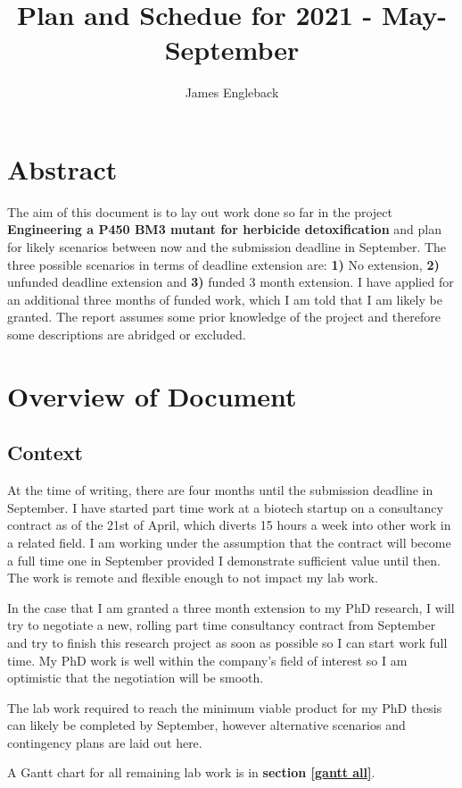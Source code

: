 \documentclass{article}
\begin{document}
\title{\textbf{Plan and Schedue for 2021 - May-September}}
\author{James Engleback}
\maketitle
\tableofcontents

\section{Abstract}
The aim of this document is to lay out work done so far in the project \textbf{Engineering a P450 BM3 mutant for herbicide detoxification} and plan for likely scenarios between now and the submission deadline in September.
The three possible scenarios in terms of deadline extension are: \textbf{1)} No extension, \textbf{2)} unfunded deadline extension and \textbf{3)} funded 3 month extension. 
I have applied for an additional three months of funded work, which I am told that I am likely be granted.
The report assumes some prior knowledge of the project and therefore some descriptions are abridged or excluded.
\par

\section{Overview of Document}
\subsection{Context}
At the time of writing, there are four months until the submission deadline in September. I have started part time work at a biotech startup on a consultancy contract as of the 21st of April, which diverts 15 hours a week into other work in a related field. I am working under the assumption that the contract will become a full time one in September provided I demonstrate sufficient value until then. The work is remote and flexible enough to not impact my lab work.
\par 
In the case that I am granted a three month extension to my PhD research, I will try to negotiate a new, rolling part time consultancy contract from September and try to finish this research project as soon as possible so I can start work full time. My PhD work is well within the company's field of interest so I am optimistic that the negotiation will be smooth.
\par
The lab work required to reach the minimum viable product for my PhD thesis can likely be completed by September, however alternative scenarios and contingency plans are laid out here. 
\par
A Gantt chart for all remaining lab work is in \textbf{section \ref{gantt all}}.
\end{document}
